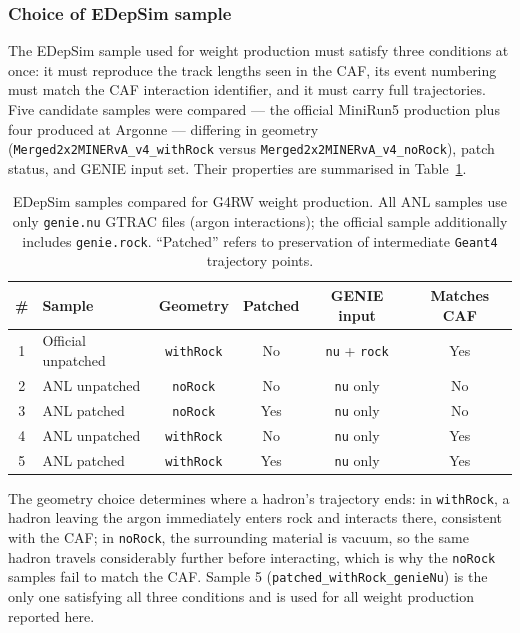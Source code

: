 \documentclass[%
article,
nofootinbib
]{revtex4-2}
\DeclareRobustCommand{\gfour}{\texttt{Geant4}}
\begin{document}

\subsubsection{\label{subsec:sample_choice}Choice of EDepSim sample}

The EDepSim sample used for weight production must satisfy three conditions at
once: it must reproduce the track lengths seen in the CAF, its event numbering
must match the CAF interaction identifier, and it must carry full trajectories.
Five candidate samples were compared --- the official MiniRun5 production plus
four produced at Argonne --- differing in geometry
(\texttt{Merged2x2MINERvA\_v4\_withRock} versus \texttt{Merged2x2MINERvA\_v4\_noRock}), patch
status, and GENIE input set. Their properties are summarised in
Table~\ref{tab:edepsim_samples}.

\begin{table}[H]
\centering
\caption{EDepSim samples compared for G4RW weight production. All ANL samples
use only \texttt{genie.nu} GTRAC files (argon interactions); the official sample
additionally includes \texttt{genie.rock}. ``Patched'' refers to preservation of
intermediate \gfour{} trajectory points.}
\label{tab:edepsim_samples}
\setlength{\tabcolsep}{14pt}
\begin{tabular}{cl|cccc}
\hline\hline
\# & Sample & Geometry & Patched & GENIE input & Matches CAF \\
\hline
1 & Official unpatched & \texttt{withRock} & No  & \texttt{nu} + \texttt{rock} & Yes \\
2 & ANL unpatched      & \texttt{noRock}   & No  & \texttt{nu} only            & No  \\
3 & ANL patched        & \texttt{noRock}   & Yes & \texttt{nu} only            & No  \\
4 & ANL unpatched      & \texttt{withRock} & No  & \texttt{nu} only            & Yes \\
5 & ANL patched        & \texttt{withRock} & Yes & \texttt{nu} only            & Yes \\
\hline\hline
\end{tabular}
\end{table}

The geometry choice determines where a hadron's trajectory ends: in
\texttt{withRock}, a hadron leaving the argon immediately enters rock and
interacts there, consistent with the CAF; in \texttt{noRock}, the
surrounding material is vacuum, so the same hadron travels considerably
further before interacting, which is why the \texttt{noRock} samples fail
to match the CAF. Sample 5 (\texttt{patched\_withRock\_genieNu}) is the
only one satisfying all three conditions and is used for all weight
production reported here.
\end{document}
